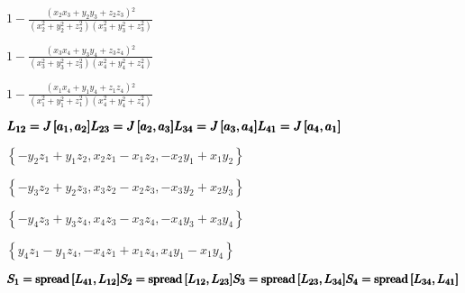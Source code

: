 \documentclass{article}
\begin{document}
\begin{doublespace}
\noindent\(1-\frac{\left(x_2 x_3+y_2 y_3+z_2 z_3\right){}^2}{\left(x_2^2+y_2^2+z_2^2\right) \left(x_3^2+y_3^2+z_3^2\right)}\)
\end{doublespace}

\begin{doublespace}
\noindent\(1-\frac{\left(x_3 x_4+y_3 y_4+z_3 z_4\right){}^2}{\left(x_3^2+y_3^2+z_3^2\right) \left(x_4^2+y_4^2+z_4^2\right)}\)
\end{doublespace}

\begin{doublespace}
\noindent\(1-\frac{\left(x_1 x_4+y_1 y_4+z_1 z_4\right){}^2}{\left(x_1^2+y_1^2+z_1^2\right) \left(x_4^2+y_4^2+z_4^2\right)}\)
\end{doublespace}

\begin{doublespace}
\noindent\(\pmb{L_{12} = J\left[a_1,a_2\right]}\\
\pmb{L_{23} = J\left[a_2,a_3\right]}\\
\pmb{L_{34} = J\left[a_3,a_4\right]}\\
\pmb{L_{41} = J\left[a_4,a_1\right]}\)
\end{doublespace}

\begin{doublespace}
\noindent\(\left\{-y_2 z_1+y_1 z_2,x_2 z_1-x_1 z_2,-x_2 y_1+x_1 y_2\right\}\)
\end{doublespace}

\begin{doublespace}
\noindent\(\left\{-y_3 z_2+y_2 z_3,x_3 z_2-x_2 z_3,-x_3 y_2+x_2 y_3\right\}\)
\end{doublespace}

\begin{doublespace}
\noindent\(\left\{-y_4 z_3+y_3 z_4,x_4 z_3-x_3 z_4,-x_4 y_3+x_3 y_4\right\}\)
\end{doublespace}

\begin{doublespace}
\noindent\(\left\{y_4 z_1-y_1 z_4,-x_4 z_1+x_1 z_4,x_4 y_1-x_1 y_4\right\}\)
\end{doublespace}

\begin{doublespace}
\noindent\(\pmb{S_1=\text{spread}\left[L_{41},L_{12}\right]}\\
\pmb{S_2=\text{spread}\left[L_{12},L_{23}\right]}\\
\pmb{S_3=\text{spread}\left[L_{23},L_{34}\right]}\\
\pmb{S_4=\text{spread}\left[L_{34},L_{41}\right]}\)
\end{doublespace}
\end{document}
